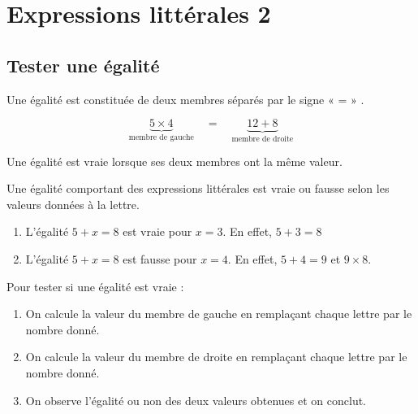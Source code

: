 \documentclass[a4paper,10pt]{report}
\begin{document}
\newpage
\setcounter{chapter}{17}
\chapter{Expressions littérales 2}

\section{Tester une égalité}

\begin{defn}
Une égalité est constituée de deux membres séparés par le signe « = » .
\end{defn}

\begin{ex}

\vspace{-5mm}
 $$\underset{\text{membre de gauche} }{\underbrace{5 \times 4}} \quad = \quad  \underset{\text{membre de droite} }{\underbrace{12 + 8}}$$
\end{ex}
 
\begin{prop}
Une égalité est vraie lorsque ses deux membres ont la même valeur.
\end{prop}

\begin{rem}Une égalité comportant des expressions littérales est vraie ou fausse selon les valeurs données à la lettre.
\end{rem}

\begin{ex}
\begin{enumerate}
\item[•] L'égalité $5 + x = 8$ est vraie pour $x = 3$. En effet, $5 + 3 = 8$
\item[•] L'égalité $5 + x = 8$ est fausse pour $x = 4$. En effet, $5 + 4 = 9$ et $9 \times 8$.
\end{enumerate}
\end{ex}

\begin{meth}

Pour tester si une égalité est vraie :
\begin{enumerate}
\item On calcule la valeur du membre de gauche en remplaçant chaque lettre par le nombre donné.
\item On calcule la valeur du membre de droite en remplaçant chaque lettre par le nombre donné.
\item On observe l'égalité ou non des deux valeurs obtenues et on conclut.
\end{enumerate}
\end{meth}
\end{document}
